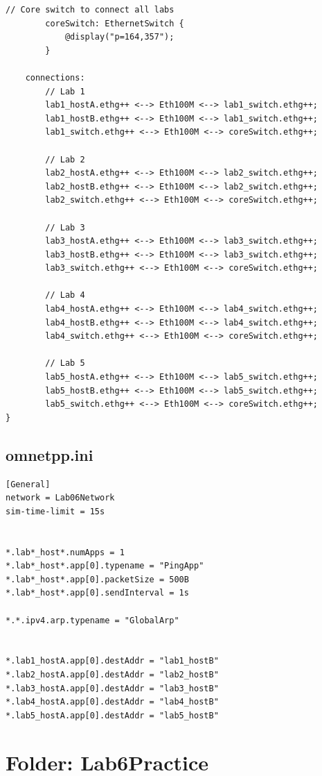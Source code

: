 \documentclass[11pt,a4paper]{article}
\begin{document}
\begin{lstlisting}[style=labcode]
        // Core switch to connect all labs
        coreSwitch: EthernetSwitch {
            @display("p=164,357");
        }

    connections:
        // Lab 1
        lab1_hostA.ethg++ <--> Eth100M <--> lab1_switch.ethg++;
        lab1_hostB.ethg++ <--> Eth100M <--> lab1_switch.ethg++;
        lab1_switch.ethg++ <--> Eth100M <--> coreSwitch.ethg++;

        // Lab 2
        lab2_hostA.ethg++ <--> Eth100M <--> lab2_switch.ethg++;
        lab2_hostB.ethg++ <--> Eth100M <--> lab2_switch.ethg++;
        lab2_switch.ethg++ <--> Eth100M <--> coreSwitch.ethg++;

        // Lab 3
        lab3_hostA.ethg++ <--> Eth100M <--> lab3_switch.ethg++;
        lab3_hostB.ethg++ <--> Eth100M <--> lab3_switch.ethg++;
        lab3_switch.ethg++ <--> Eth100M <--> coreSwitch.ethg++;

        // Lab 4
        lab4_hostA.ethg++ <--> Eth100M <--> lab4_switch.ethg++;
        lab4_hostB.ethg++ <--> Eth100M <--> lab4_switch.ethg++;
        lab4_switch.ethg++ <--> Eth100M <--> coreSwitch.ethg++;

        // Lab 5
        lab5_hostA.ethg++ <--> Eth100M <--> lab5_switch.ethg++;
        lab5_hostB.ethg++ <--> Eth100M <--> lab5_switch.ethg++;
        lab5_switch.ethg++ <--> Eth100M <--> coreSwitch.ethg++;
}
\end{lstlisting}

\subsection*{omnetpp.ini}
\begin{lstlisting}[style=labcode]
[General]
network = Lab06Network
sim-time-limit = 15s


*.lab*_host*.numApps = 1
*.lab*_host*.app[0].typename = "PingApp"
*.lab*_host*.app[0].packetSize = 500B
*.lab*_host*.app[0].sendInterval = 1s

*.*.ipv4.arp.typename = "GlobalArp"


*.lab1_hostA.app[0].destAddr = "lab1_hostB"
*.lab2_hostA.app[0].destAddr = "lab2_hostB"
*.lab3_hostA.app[0].destAddr = "lab3_hostB"
*.lab4_hostA.app[0].destAddr = "lab4_hostB"
*.lab5_hostA.app[0].destAddr = "lab5_hostB"
\end{lstlisting}

\section{Folder: Lab6Practice}
\end{document}
